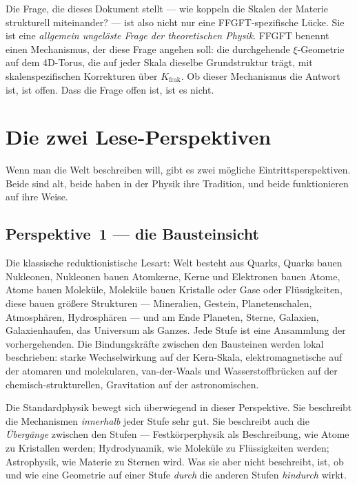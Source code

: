 Die Frage, die dieses Dokument stellt --- wie koppeln die Skalen der
Materie strukturell miteinander? --- ist also nicht nur eine
FFGFT-spezifische Lücke. Sie ist eine \emph{allgemein ungelöste Frage
der theoretischen Physik}. FFGFT benennt einen Mechanismus, der diese
Frage angehen soll: die durchgehende $\xi$-Geometrie auf dem 4D-Torus,
die auf jeder Skala dieselbe Grundstruktur trägt, mit
skalenspezifischen Korrekturen über $K_{\mathrm{frak}}$. Ob dieser
Mechanismus die Antwort ist, ist offen. Dass die Frage offen ist, ist
es nicht.

\section{Die zwei Lese-Perspektiven}

Wenn man die Welt beschreiben will, gibt es zwei mögliche
Eintrittsperspektiven. Beide sind alt, beide haben in der Physik ihre
Tradition, und beide funktionieren auf ihre Weise.

\subsection*{Perspektive~1 --- die Bausteinsicht}

Die klassische reduktionistische Lesart: Welt besteht aus Quarks,
Quarks bauen Nukleonen, Nukleonen bauen Atomkerne, Kerne und Elektronen
bauen Atome, Atome bauen Moleküle, Moleküle bauen Kristalle oder Gase
oder Flüssigkeiten, diese bauen größere Strukturen --- Mineralien,
Gestein, Planetenschalen, Atmosphären, Hydrosphären --- und am Ende
Planeten, Sterne, Galaxien, Galaxienhaufen, das Universum als Ganzes.
Jede Stufe ist eine Ansammlung der vorhergehenden. Die Bindungskräfte
zwischen den Bausteinen werden lokal beschrieben: starke Wechselwirkung
auf der Kern-Skala, elektromagnetische auf der atomaren und
molekularen, van-der-Waals und Wasserstoffbrücken auf der
chemisch-strukturellen, Gravitation auf der astronomischen.

Die Standardphysik bewegt sich überwiegend in dieser Perspektive. Sie
beschreibt die Mechanismen \emph{innerhalb} jeder Stufe sehr gut. Sie
beschreibt auch die \emph{Übergänge} zwischen den Stufen ---
Festkörperphysik als Beschreibung, wie Atome zu Kristallen werden;
Hydrodynamik, wie Moleküle zu Flüssigkeiten werden; Astrophysik, wie
Materie zu Sternen wird. Was sie aber nicht beschreibt, ist, ob und
wie eine Geometrie auf einer Stufe \emph{durch} die anderen Stufen
\emph{hindurch} wirkt.

